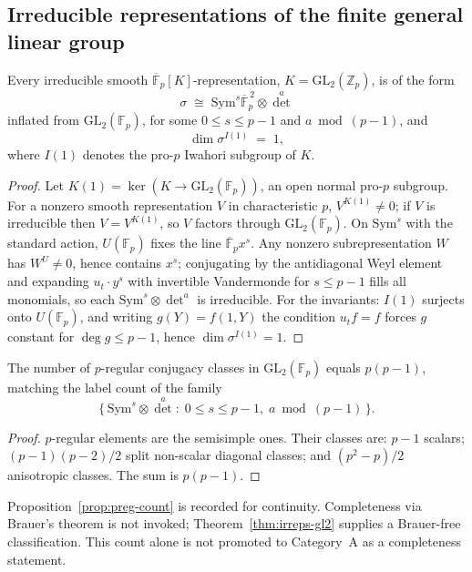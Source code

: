\subsection{Irreducible representations of the finite general linear group}
\begin{proposition}\label{prop:irreps-k}
Every irreducible smooth $\overline{\mathbb{F}}_p[K]$-representation, $K=\mathrm{GL}_2(\mathbb{Z}_p)$, is of the form
\[
\sigma\;\cong\;\mathrm{Sym}^s\overline{\mathbb{F}}_p^{\,2}\otimes\det^a
\]
inflated from $\mathrm{GL}_2(\mathbb{F}_p)$, for some $0\le s\le p-1$ and $a\bmod(p-1)$, and
\[
\dim\sigma^{I(1)}\;=\;1,
\]
where $I(1)$ denotes the pro-$p$ Iwahori subgroup of $K$.
\end{proposition}
\begin{proof}
Let $K(1)=\ker(K\to\mathrm{GL}_2(\mathbb{F}_p))$, an open normal pro-$p$ subgroup. For a nonzero smooth representation $V$ in characteristic $p$, $V^{K(1)}\neq0$; if $V$ is irreducible then $V=V^{K(1)}$, so $V$ factors through $\mathrm{GL}_2(\mathbb{F}_p)$. On $\mathrm{Sym}^s$ with the standard action, $U(\mathbb{F}_p)$ fixes the line $\overline{\mathbb{F}}_p x^s$. Any nonzero subrepresentation $W$ has $W^U\neq0$, hence contains $x^s$; conjugating by the antidiagonal Weyl element and expanding $u_t\cdot y^s$ with invertible Vandermonde for $s\le p-1$ fills all monomials, so each $\mathrm{Sym}^s\otimes\det^a$ is irreducible. For the invariants: $I(1)$ surjects onto $U(\mathbb{F}_p)$, and writing $g(Y)=f(1,Y)$ the condition $u_t f=f$ forces $g$ constant for $\deg g\le p-1$, hence $\dim\sigma^{I(1)}=1$.
\end{proof}

\begin{proposition}\label{prop:preg-count}
The number of $p$-regular conjugacy classes in $\mathrm{GL}_2(\mathbb{F}_p)$ equals $p(p-1)$, matching the label count of the family
\[
\bigl\{\,\mathrm{Sym}^s\otimes\det^a:\;0\le s\le p-1,\; a\bmod(p-1)\,\bigr\}.
\]
\end{proposition}
\begin{proof}
$p$-regular elements are the semisimple ones. Their classes are: $p-1$ scalars; $(p-1)(p-2)/2$ split non-scalar diagonal classes; and $(p^2-p)/2$ anisotropic classes. The sum is $p(p-1)$.
\end{proof}
\begin{remark}
Proposition~\ref{prop:preg-count} is recorded for continuity. Completeness via Brauer's theorem is not invoked; Theorem~\ref{thm:irreps-gl2} supplies a Brauer-free classification. This count alone is not promoted to Category~A as a completeness statement.
\end{remark}

